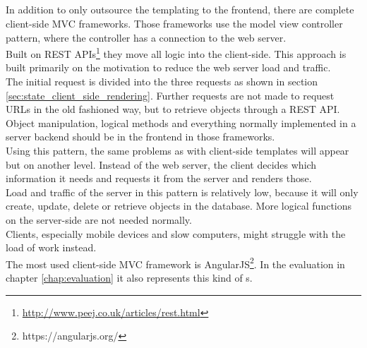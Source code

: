 \subsection{\ClientSideMVC{}\label{clientSideMVC}}
In addition to only outsource the templating to the frontend, there are complete client-side MVC frameworks.
Those frameworks use the model view controller pattern, where the controller has a connection to the web server.
\\
Built on REST APIs\footnote{\url{http://www.peej.co.uk/articles/rest.html}} they move all logic into the client-side.
This approach is built primarily on the motivation to reduce the web server load and traffic.
\\
The initial request is divided into the three requests as shown in section \ref{sec:state_client_side_rendering}.
Further requests are not made to request URLs in the old fashioned way, but to retrieve objects through a REST API. 
Object manipulation, logical methods and everything normally implemented in a server backend should be in the frontend in those frameworks.
\\
Using this pattern, the same problems as with client-side templates will appear but on another level.
Instead of the web server, the client decides which information it needs and requests it from the server and renders those.
\\
Load and traffic of the server in this pattern is relatively low, because it will only create, update, delete or retrieve objects in the database. 
More logical functions on the server-side are not needed normally.
\\
Clients, especially mobile devices and slow computers, might struggle with the load of work instead.
\\
The most used client-side MVC framework is AngularJS\footnote{https://angularjs.org/}. In the evaluation in chapter \ref{chap:evaluation} it also represents this kind of \webApplication{}s.

